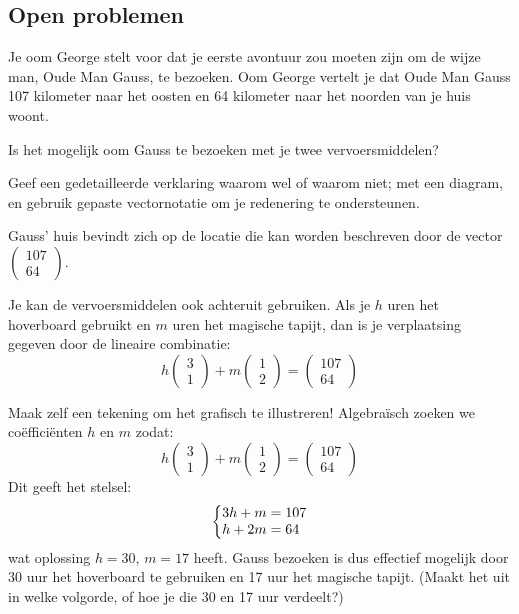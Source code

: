 \documentclass{ximera}
\begin{document}
\subsection*{Open problemen}
\begin{exercise}
Je oom George stelt voor dat je eerste avontuur zou moeten zijn om de wijze man, Oude Man Gauss, te bezoeken.
Oom George vertelt je dat Oude Man Gauss 107 kilometer naar het oosten en 64 kilometer naar het noorden van je huis woont.\newline

Is het mogelijk oom Gauss te bezoeken met je twee vervoersmiddelen?
\begin{multipleChoice}  
\end{multipleChoice}
Geef een gedetailleerde verklaring waarom wel of waarom niet; met een diagram, en gebruik gepaste vectornotatie om je redenering te ondersteunen.
\begin{hint}
Gauss' huis bevindt zich op de locatie die kan worden beschreven door de vector $\begin{pmatrix} 107 \\ 64 \end{pmatrix}$.
\end{hint}
\begin{hint}
Je kan de vervoersmiddelen ook achteruit gebruiken.
Als je \(h\) uren het hoverboard gebruikt en \(m\) uren het magische tapijt, dan is je verplaatsing gegeven door de lineaire combinatie:
\[h \begin{pmatrix} 3 \\ 1 \end{pmatrix} + m \begin{pmatrix} 1 \\ 2 \end{pmatrix} = \begin{pmatrix} 107 \\ 64 \end{pmatrix}\]
\end{hint}
\begin{oplossing}
Maak zelf een tekening om het grafisch te illustreren!\newline
Algebraïsch zoeken we coëfficiënten \(h\) en \(m\) zodat:
\[h \begin{pmatrix} 3 \\ 1 \end{pmatrix} + m \begin{pmatrix} 1 \\ 2 \end{pmatrix} = \begin{pmatrix} 107 \\ 64 \end{pmatrix}\]
Dit geeft het stelsel:
\[
\left\{
    \begin{array}{@{}l@{}}
    3h+m=107\\
    h+2m=64
    \end{array}
\right.
\]
wat oplossing \(h=30\), \(m=17\) heeft.
Gauss bezoeken is dus effectief mogelijk door 30 uur het hoverboard te gebruiken en 17 uur het magische tapijt.
(Maakt het uit in welke volgorde, of hoe je die 30 en 17 uur verdeelt?)
\end{oplossing}
\end{exercise}
\end{document}
